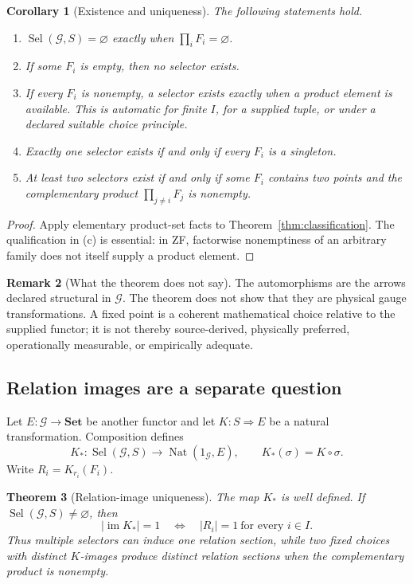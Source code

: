 \documentclass[11pt]{article}
\newtheorem{theorem}{Theorem}
\newtheorem{corollary}[theorem]{Corollary}
\theoremstyle{definition}
\newtheorem{remark}[theorem]{Remark}
\newcommand{\G}{\mathcal G}
\newcommand{\Nat}{\operatorname{Nat}}
\newcommand{\Img}{\operatorname{im}}
\newcommand{\Sel}{\operatorname{Sel}}
\begin{document}
\begin{corollary}[Existence and uniqueness]
\label{cor:existence}
The following statements hold.
\begin{enumerate}[label=(\alph*)]
  \item \(\Sel(\G,S)=\varnothing\) exactly when
        \(\prod_iF_i=\varnothing\).
  \item If some \(F_i\) is empty, then no selector exists.
  \item If every \(F_i\) is nonempty, a selector exists exactly when a product
        element is available.  This is automatic for finite \(I\), for a
        supplied tuple, or under a declared suitable choice principle.
  \item Exactly one selector exists if and only if every \(F_i\) is a
        singleton.
  \item At least two selectors exist if and only if some \(F_i\) contains two
        points and the complementary product
        \(\prod_{j\ne i}F_j\) is nonempty.
\end{enumerate}
\end{corollary}

\begin{proof}
Apply elementary product-set facts to
Theorem~\ref{thm:classification}.  The qualification in (c) is essential:
in ZF, factorwise nonemptiness of an arbitrary family does not itself supply
a product element.
\end{proof}

\begin{remark}[What the theorem does not say]
The automorphisms are the arrows declared structural in \(\G\).  The theorem
does not show that they are physical gauge transformations.  A fixed point is
a coherent mathematical choice relative to the supplied functor; it is not
thereby source-derived, physically preferred, operationally measurable, or
empirically adequate.
\end{remark}

\subsection{Relation images are a separate question}

Let \(E:\G\to\mathbf{Set}\) be another functor and let
\(K:S\Rightarrow E\) be a natural transformation.  Composition defines
\[
  K_*:\Sel(\G,S)\longrightarrow\Nat(1_{\G},E),\qquad
  K_*(\sigma)=K\circ\sigma .
\]
Write \(R_i=K_{r_i}(F_i)\).

\begin{theorem}[Relation-image uniqueness]
\label{thm:relation-image}
The map \(K_*\) is well defined.  If \(\Sel(\G,S)\ne\varnothing\), then
\[
  |\Img K_*|=1
  \quad\Longleftrightarrow\quad
  |R_i|=1\ \text{for every }i\in I.
\]
Thus multiple selectors can induce one relation section, while two fixed
choices with distinct \(K\)-images produce distinct relation sections when
the complementary product is nonempty.
\end{theorem}
\end{document}

